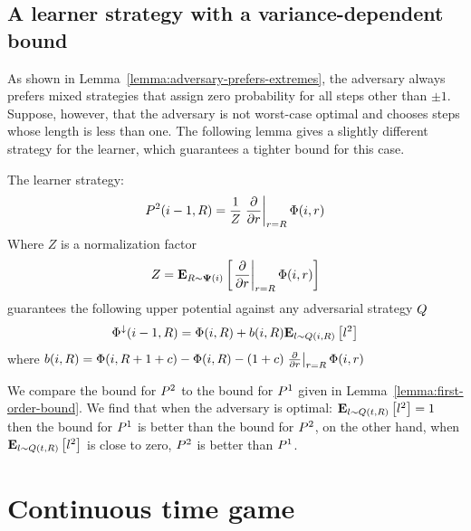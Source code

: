 \documentclass{article}[12pt]
\begin{document}
  \subsection{A learner strategy with a variance-dependent bound}

  As shown in Lemma~\ref{lemma:adversary-prefers-extremes}, the
  adversary always prefers mixed strategies that assign zero
  probability for all steps other than $\pm 1$. Suppose, however, that
  the adversary is not worst-case optimal and chooses steps whose
  length is less than one. The following lemma gives a slightly
  different strategy for the learner, which guarantees a tighter bound
  for this case.

  \begin{lemma} \label{lemma:second-order-bound}
      The learner strategy:
      \begin{equation} \label{eqn:learner-strat-2}
      P^2(i-1,R) =  \frac{1}{Z}
      \left. \frac{\partial}{\partial r} \right|_{r=R} \Phi(i,r)
      \end{equation}
      Where $Z$ is a normalization factor
      $$Z = {\bf E}_{R \sim {\bf \Psi}(i)}\left[ \left. \frac{\partial}{\partial r} \right|_{r=R} \Phi(i,r) \right]$$
      guarantees the following upper potential against any adversarial
      strategy $Q$
      \begin{equation} \label{eqn:value-iteration-upper}
        \Phi^{\downarrow}(i-1, R) = \Phi(i,R) + b(i,R) {\bf E}_{l \sim Q(i,R)}\left[ l^2 \right]
      \end{equation}
      where $b(i,R) = \Phi(i,R+1+c) -\Phi(i,R) - (1+c) \left. \frac{\partial}{\partial r} \right|_{r=R} \Phi(i,r)$
   \end{lemma}

We compare the bound for $P^2$ to the bound for $P^1$
given in Lemma~\ref{lemma:first-order-bound}. We find that when the 
adversary is optimal: ${\bf E}_{l \sim Q(t,R)}\left[ l^2 \right]=1$ then the
bound for $P^1$ is better than the bound for $P^2$, on the
other hand, when ${\bf E}_{l \sim Q(t,R)}\left[ l^2 \right]$ is close to zero,
$P^2$ is better than $P^1$.  

\section{Continuous time game}
\end{document}
